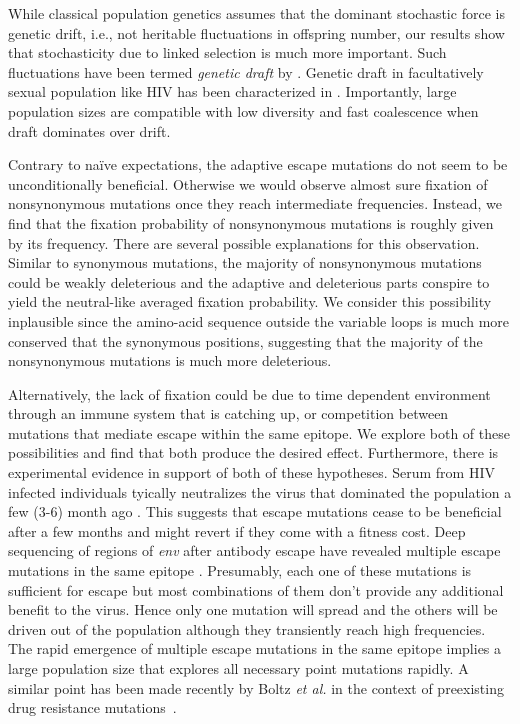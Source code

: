 \documentclass[rmp, twocolumn]{revtex4}
\newcommand{\env}{\textit{env}}
\begin{document}
While classical population genetics
assumes that the dominant stochastic force is genetic drift, i.e., not heritable
fluctuations in offspring number, our results show that stochasticity due to
linked selection is much more important. Such fluctuations have been termed
\emph{genetic draft} by \citet{gillespie_genetic_2000}. Genetic draft in
facultatively sexual population like HIV has been characterized in
\citep{neher_genetic_2011}. Importantly, large population sizes are compatible
with low diversity and fast coalescence when draft dominates over drift.

Contrary to na\"ive expectations, the adaptive escape mutations do not seem to be
unconditionally beneficial. Otherwise we would observe almost sure fixation of
nonsynonymous mutations once they reach intermediate frequencies. Instead, we
find that the fixation probability of nonsynonymous mutations is roughly given
by its frequency. There are several possible explanations for this observation. 
Similar to synonymous mutations, the majority of nonsynonymous mutations could
be weakly deleterious and the adaptive and deleterious parts conspire to yield
the neutral-like averaged fixation probability. We consider this possibility
inplausible since the amino-acid sequence outside the variable loops is much
more conserved that the synonymous positions, suggesting that the majority of
the nonsynonymous mutations is much more deleterious. 


Alternatively, the lack of fixation could be due to time dependent environment
through an immune system that is catching up, or competition between mutations
that mediate escape within the same epitope. We explore both of these
possibilities and find that both produce the desired effect. Furthermore, there
is experimental evidence in support of both of these hypotheses. Serum from HIV
infected individuals tyically neutralizes the virus that dominated the
population a few (3-6) month ago \citep{richman_rapid_2003}. This suggests that
escape mutations cease to be beneficial after a few months and might revert if
they come with a fitness cost. Deep sequencing of regions of \env{} after
antibody escape have revealed multiple escape mutations in the same epitope
\citep{moore_limited_2009, bar_early_2012}. Presumably, each one of these
mutations is sufficient for escape but most combinations of them don't provide
any additional benefit to the virus. Hence only one mutation will spread and the
others will be driven out of the population although they transiently reach high
frequencies. The rapid emergence of multiple escape mutations in the same
epitope implies a large population size that explores all necessary point
mutations rapidly. A similar point has been made recently by Boltz {\it et al.}
in the context of preexisting drug resistance
mutations~\citep{boltz_ultrasensitive_2012}. 
\end{document}
